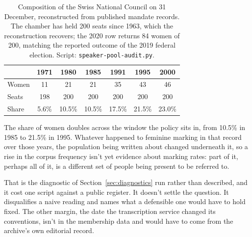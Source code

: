 \begin{table}[!ht]
\centering
\footnotesize
\caption{Composition of the Swiss National Council on 31 December, reconstructed from published mandate records. The chamber has held 200 seats since 1963, which the reconstruction recovers; the 2020 row returns 84 women of 200, matching the reported outcome of the 2019 federal election. Script: \texttt{speaker-pool-audit.py}.}
\label{tab:speakerpool}
\begin{tabular}{@{}l c c c c c c@{}}
\toprule
 & 1971 & 1980 & 1985 & 1991 & 1995 & 2000 \\
\midrule
Women & 11 & 21 & 21 & 35 & 43 & 46 \\
Seats & 198 & 200 & 200 & 200 & 200 & 200 \\
Share & 5.6\% & 10.5\% & 10.5\% & 17.5\% & 21.5\% & 23.0\% \\
\bottomrule
\end{tabular}
\end{table}

The share of women doubles across the window the policy sits in, from 10.5\% in 1985 to 21.5\% in 1995. Whatever happened to feminine marking in that record over those years, the population being written about changed underneath it, so a rise in the corpus frequency isn't yet evidence about marking rates: part of it, perhaps all of it, is a different set of people being present to be referred to.

That is the diagnostic of Section~\ref{sec:diagnostics} run rather than described, and it cost one script against a public register. It doesn't settle the question. It disqualifies a naive reading and names what a defensible one would have to hold fixed. The other margin, the date the transcription service changed its conventions, isn't in the membership data and would have to come from the archive's own editorial record.

